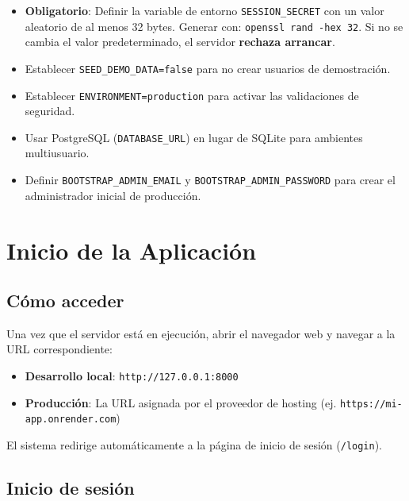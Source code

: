 \documentclass[10pt,letterpaper]{report}
\begin{document}
\begin{warningbox}
  \begin{itemize}[leftmargin=0.5cm]
    \item \textbf{Obligatorio}: Definir la variable de entorno \texttt{SESSION\_SECRET} con un valor aleatorio de al menos 32 bytes. Generar con: \texttt{openssl rand -hex 32}. Si no se cambia el valor predeterminado, el servidor \textbf{rechaza arrancar}.
    \item Establecer \texttt{SEED\_DEMO\_DATA=false} para no crear usuarios de demostración.
    \item Establecer \texttt{ENVIRONMENT=production} para activar las validaciones de seguridad.
    \item Usar PostgreSQL (\texttt{DATABASE\_URL}) en lugar de SQLite para ambientes multiusuario.
    \item Definir \texttt{BOOTSTRAP\_ADMIN\_EMAIL} y \texttt{BOOTSTRAP\_ADMIN\_PASSWORD} para crear el administrador inicial de producción.
  \end{itemize}
\end{warningbox}

\chapter{Inicio de la Aplicación}

\section{Cómo acceder}

Una vez que el servidor está en ejecución, abrir el navegador web y navegar a la URL correspondiente:

\begin{itemize}[leftmargin=2cm]
  \item \textbf{Desarrollo local}: \texttt{http://127.0.0.1:8000}
  \item \textbf{Producción}: La URL asignada por el proveedor de hosting (ej. \texttt{https://mi-app.onrender.com})
\end{itemize}

El sistema redirige automáticamente a la página de inicio de sesión (\texttt{/login}).

\section{Inicio de sesión}
\end{document}
